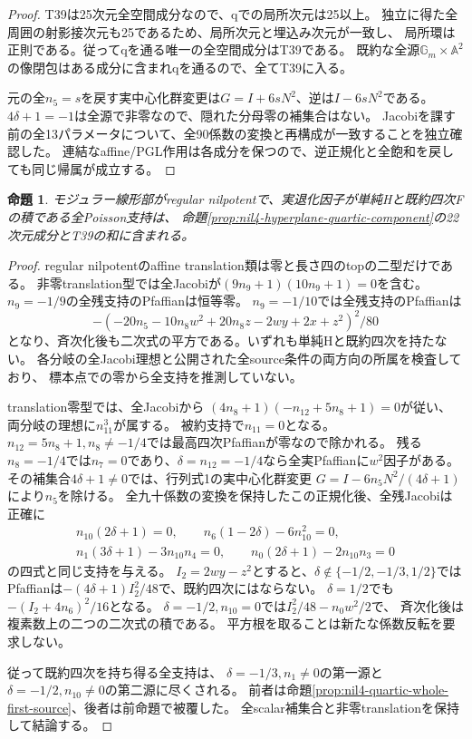 \documentclass[a4paper,11pt]{ltjsarticle}
\newtheorem{proposition}{命題}[section]
\theoremstyle{definition}
\begin{document}
\begin{proof}
T39は25次元全空間成分なので、qでの局所次元は25以上。
独立に得た全周囲の射影接次元も25であるため、局所次元と埋込み次元が一致し、
局所環は正則である。従ってqを通る唯一の全空間成分はT39である。
既約な全源$\mathbb G_m\times\mathbb A^2$の像閉包はある成分に含まれqを通るので、全てT39に入る。

元の全$n_5=s$を戻す実中心化群変更は$G=I+6sN^2$、逆は$I-6sN^2$である。
$4\delta+1=-1$は全源で非零なので、隠れた分母零の補集合はない。
Jacobiを課す前の全13パラメータについて、全90係数の変換と再構成が一致することを独立確認した。
連結なaffine/PGL作用は各成分を保つので、逆正規化と全飽和を戻しても同じ帰属が成立する。
\end{proof}

\begin{proposition}\label{prop:nil4-quartic-all-support}
モジュラー線形部がregular nilpotentで、実退化因子が単純Hと既約四次Fの積である全Poisson支持は、
命題\ref{prop:nil4-hyperplane-quartic-component}の22次元成分とT39の和に含まれる。
\end{proposition}
\begin{proof}
regular nilpotentのaffine translation類は零と長さ四のtopの二型だけである。
非零translation型では全Jacobiが$(9n_9+1)(10n_9+1)=0$を含む。
$n_9=-1/9$の全残支持のPfaffianは恒等零。
$n_9=-1/10$では全残支持のPfaffianは
\[
 -(-20n_5-10n_8w^2+20n_8z-2wy+2x+z^2)^2/80
\]
となり、斉次化後も二次式の平方である。いずれも単純Hと既約四次を持たない。
各分岐の全Jacobi理想と公開された全source条件の両方向の所属を検査しており、
標本点での零から全支持を推測していない。

translation零型では、全Jacobiから
$(4n_8+1)(-n_{12}+5n_8+1)=0$が従い、両分岐の理想に$n_{11}^3$が属する。
被約支持で$n_{11}=0$となる。
$n_{12}=5n_8+1,n_8\ne-1/4$では最高四次Pfaffianが零なので除かれる。
残る$n_8=-1/4$では$n_7=0$であり、$\delta=n_{12}=-1/4$なら全実Pfaffianに$w^2$因子がある。
その補集合$4\delta+1\ne0$では、行列式1の実中心化群変更
$G=I-6n_5N^2/(4\delta+1)$により$n_5$を除ける。
全九十係数の変換を保持したこの正規化後、全残Jacobiは正確に
\[
\begin{gathered}
 n_{10}(2\delta+1)=0,\qquad n_6(1-2\delta)-6n_{10}^2=0,\\
 n_1(3\delta+1)-3n_{10}n_4=0,\qquad
 n_0(2\delta+1)-2n_{10}n_3=0
\end{gathered}
\]
の四式と同じ支持を与える。
$I_2=2wy-z^2$とすると、$\delta\notin\{-1/2,-1/3,1/2\}$では
Pfaffianは$-(4\delta+1)I_2^2/48$で、既約四次にはならない。
$\delta=1/2$でも$-(I_2+4n_6)^2/16$となる。
$\delta=-1/2,n_{10}=0$では$I_2^2/48-n_0w^2/2$で、
斉次化後は複素数上の二つの二次式の積である。
平方根を取ることは新たな係数反転を要求しない。

従って既約四次を持ち得る全支持は、
$\delta=-1/3,n_1\ne0$の第一源と$\delta=-1/2,n_{10}\ne0$の第二源に尽くされる。
前者は命題\ref{prop:nil4-quartic-whole-first-source}、後者は前命題で被覆した。
全scalar補集合と非零translationを保持して結論する。
\end{proof}
\end{document}
